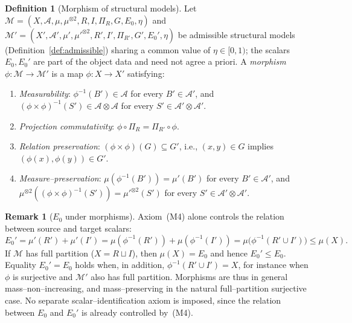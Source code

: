 \documentclass[11pt]{article}
\numberwithin{equation}{section}
\theoremstyle{definition}
\newtheorem{definition}[theorem]{Definition}
\newtheorem{remark}[theorem]{Remark}
\begin{document}
\begin{definition}[Morphism of structural models]\label{def:morphism}
Let $\mathcal M=(X,\allowbreak\mathcal A,\allowbreak\mu,\allowbreak\mu^{\otimes2},\allowbreak R,\allowbreak I,\allowbreak\Pi_R,\allowbreak G,\allowbreak E_0,\allowbreak\eta)$ and $\mathcal M'=(X',\allowbreak\mathcal A',\allowbreak\mu',\allowbreak\mu'^{\otimes2},\allowbreak R',\allowbreak I',\allowbreak\Pi_{R'},\allowbreak G',\allowbreak E_0',\allowbreak\eta)$ be admissible structural models (Definition~\ref{def:admissible}) sharing a common value of $\eta\in[0,1)$; the scalars $E_0,E_0'$ are part of the object data and need not agree a priori. A \emph{morphism} $\phi:\mathcal M\to\mathcal M'$ is a map $\phi:X\to X'$ satisfying:
\begin{enumerate}[label=\emph{(M\arabic*)},nosep,leftmargin=2.5em]
\item \emph{Measurability}: $\phi^{-1}(B')\in\mathcal A$ for every $B'\in\mathcal A'$, and $(\phi\times\phi)^{-1}(S')\in\mathcal A\otimes\mathcal A$ for every $S'\in\mathcal A'\otimes\mathcal A'$.
\item \emph{Projection commutativity}: $\phi\circ\Pi_R=\Pi_{R'}\circ\phi$.
\item \emph{Relation preservation}: $(\phi\times\phi)(G)\subseteq G'$, i.e., $(x,y)\in G$ implies $(\phi(x),\phi(y))\in G'$.
\item \emph{Measure--preservation}: $\mu(\phi^{-1}(B'))=\mu'(B')$ for every $B'\in\mathcal A'$, and $\mu^{\otimes2}((\phi\times\phi)^{-1}(S'))=\mu'^{\otimes2}(S')$ for every $S'\in\mathcal A'\otimes\mathcal A'$.
\end{enumerate}
\end{definition}

\begin{remark}[$E_0$ under morphisms]\label{rem:E0-morphism}
Axiom~(M4) alone controls the relation between source and target scalars:
\[
E_0'=\mu'(R')+\mu'(I')=\mu(\phi^{-1}(R'))+\mu(\phi^{-1}(I'))=\mu\big(\phi^{-1}(R'\cup I')\big)\le\mu(X).
\]
If $\mathcal M$ has full partition ($X=R\sqcup I$), then $\mu(X)=E_0$ and hence $E_0'\le E_0$. Equality $E_0'=E_0$ holds when, in addition, $\phi^{-1}(R'\cup I')=X$, for instance when $\phi$ is surjective and $\mathcal M'$ also has full partition. Morphisms are thus in general mass--non--increasing, and mass--preserving in the natural full--partition surjective case. No separate scalar--identification axiom is imposed, since the relation between $E_0$ and $E_0'$ is already controlled by~(M4).
\end{remark}
\end{document}
